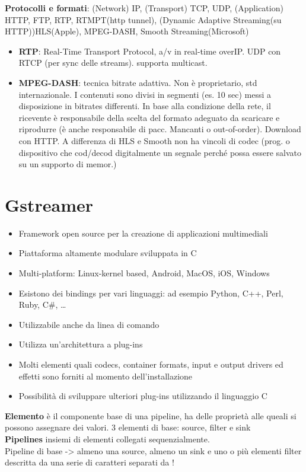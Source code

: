 \documentclass[8pt,a4paper]{article}
\begin{document}
\begin{multicols}{5}
    \textbf{Protocolli e formati}: (Network) IP, (Transport) TCP, UDP, (Application) HTTP, FTP, RTP, RTMPT(http tunnel), (Dynamic Adaptive Streaming(su HTTP))HLS(Apple), MPEG-DASH, Smooth Streaming(Microsoft) 
    \begin{itemize}
      \item \textbf{RTP}: Real-Time Transport Protocol, a/v in real-time overIP. UDP con RTCP (per sync delle streams). supporta multicast.
      \item \textbf{MPEG-DASH}: tecnica bitrate adattiva. Non è proprietario, std internazionale. I contenuti sono divisi in segmenti (es. 10 sec) messi a disposizione in bitrates differenti. In base alla condizione della rete, il ricevente è responsabile della scelta del formato adeguato da scaricare e riprodurre (è anche responsabile di pacc. Mancanti o out-of-order). Download con HTTP. A differenza di HLS e Smooth non ha vincoli di codec (prog. o dispositivo che cod/decod digitalmente un segnale perché possa essere salvato su un supporto di memor.)
    \end{itemize}

    \section{Gstreamer}
    \begin{itemize}
     \item Framework open source per la creazione di applicazioni multimediali
     \item Piattaforma altamente modulare sviluppata in C
     \item Multi-platform: Linux-kernel based, Android, MacOS, iOS, Windows
     \item Esistono dei bindings per vari linguaggi: ad esempio Python, C++, Perl, Ruby, C#, …
     \item Utilizzabile anche da linea di comando
     \item Utilizza un’architettura a plug-ins
     \item Molti elementi quali codecs, container formats, input e output drivers ed effetti sono forniti al momento dell’installazione
     \item Possibilità di sviluppare ulteriori plug-ins utilizzando il linguaggio C
    \end{itemize}
    \textbf{Elemento} è il componente base di una pipeline, ha delle proprietà alle queali si possono assegnare dei valori.
    3 elementi di base: source, filter e sink \\
    \textbf{Pipelines} insiemi di elementi collegati sequenzialmente. \\
    Pipeline di base -> almeno una source, almeno un sink e uno o più elementi filter 
    descritta da una serie di caratteri separati da !

\end{multicols}
\end{document}
